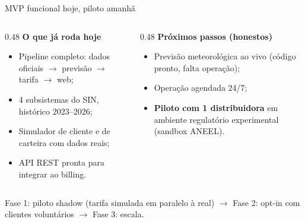 \documentclass[aspectratio=169,11pt]{beamer}
\begin{document}
\begin{frame}{MVP funcional hoje, piloto amanhã}
  \begin{columns}[T]
    \begin{column}{0.48\textwidth}
      \textbf{\textcolor{verde}{O que já roda hoje}}
      \begin{itemize}\setlength\itemsep{1.5mm}
        \item Pipeline completo: dados oficiais $\to$ previsão $\to$ tarifa $\to$ web;
        \item 4 subsistemas do SIN, histórico 2023--2026;
        \item Simulador de cliente e de carteira com dados reais;
        \item API REST pronta para integrar ao billing.
      \end{itemize}
    \end{column}
    \begin{column}{0.48\textwidth}
      \textbf{\textcolor{laranja}{Próximos passos (honestos)}}
      \begin{itemize}\setlength\itemsep{1.5mm}
        \item Previsão meteorológica ao vivo (código pronto, falta operação);
        \item Operação agendada 24/7;
        \item \textbf{Piloto com 1 distribuidora} em ambiente regulatório experimental (sandbox ANEEL).
      \end{itemize}
    \end{column}
  \end{columns}
  \vspace{4mm}
  \centering
  {\small\textcolor{cinza}{Fase 1: piloto shadow (tarifa simulada em paralelo à real) $\to$ Fase 2: opt-in com clientes voluntários $\to$ Fase 3: escala.}}
\end{frame}
\end{document}
